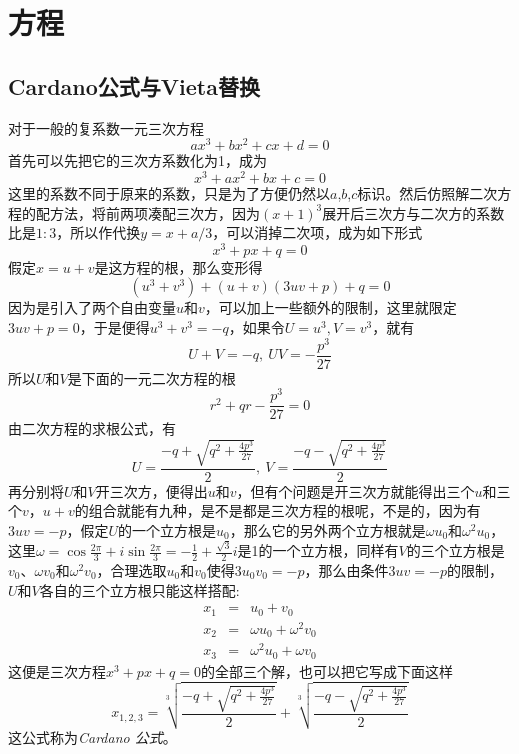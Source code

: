 
\section{方程}
\label{sec:solve-high-equation}

\subsection{Cardano公式与Vieta替换}
\label{sec:solve-equation-with-3-degree}

对于一般的复系数一元三次方程
\begin{equation*}
  ax^3+bx^2+cx+d=0
\end{equation*}
首先可以先把它的三次方系数化为1，成为
\begin{equation*}
  x^3+ax^2+bx+c=0
\end{equation*}
这里的系数不同于原来的系数，只是为了方便仍然以$a$,$b$,$c$标识。然后仿照解二次方程的配方法，将前两项凑配三次方，因为$(x+1)^3$展开后三次方与二次方的系数比是$1:3$，所以作代换$y=x+a/3$，可以消掉二次项，成为如下形式
\begin{equation*}
  x^3+px+q=0
\end{equation*}
假定$x=u+v$是这方程的根，那么变形得
\begin{equation*}
  (u^3+v^3)+(u+v)(3uv+p)+q=0
\end{equation*}
因为是引入了两个自由变量$u$和$v$，可以加上一些额外的限制，这里就限定$3uv+p=0$，于是便得$u^3+v^3=-q$，如果令$U=u^3,V=v^3$，就有
\begin{equation*}
  U+V = -q, \  UV=-\frac{p^3}{27}
\end{equation*}
所以$U$和$V$是下面的一元二次方程的根
\begin{equation*}
  r^2+qr-\frac{p^3}{27} = 0
\end{equation*}
由二次方程的求根公式，有
\begin{equation*}
  U = \frac{-q+\sqrt{q^2+\frac{4p^3}{27}}}{2}, \  V = \frac{-q-\sqrt{q^2+\frac{4p^3}{27}}}{2}
\end{equation*}
再分别将$U$和$V$开三次方，便得出$u$和$v$，但有个问题是开三次方就能得出三个$u$和三个$v$，$u+v$的组合就能有九种，是不是都是三次方程的根呢，不是的，因为有$3uv=-p$，假定$U$的一个立方根是$u_0$，那么它的另外两个立方根就是$\omega u_0$和$\omega^2 u_0$，这里$\omega=\cos{\frac{2\pi}{3}}+i\sin{\frac{2\pi}{3}}=-\frac{1}{2}+\frac{\sqrt{3}}{2}i$是1的一个立方根，同样有$V$的三个立方根是$v_0$、$\omega v_0$和$\omega^2 v_0$，合理选取$u_0$和$v_0$使得$3u_0v_0=-p$，那么由条件$3uv=-p$的限制，$U$和$V$各自的三个立方根只能这样搭配:
\begin{eqnarray*}
  x_1 & = & u_0+v_0 \\
  x_2 & = & \omega u_0 + \omega^2 v_0 \\
  x_3 & = & \omega^2 u_0 + \omega v_0
\end{eqnarray*}
这便是三次方程$x^3+px+q=0$的全部三个解，也可以把它写成下面这样
\begin{equation}
  \label{eq:cardano-formula}
  x_{1,2,3} = \sqrt[3]{\frac{-q+\sqrt{q^2+\frac{4p^3}{27}}}{2}} + \sqrt[3]{\frac{-q-\sqrt{q^2+\frac{4p^3}{27}}}{2}}
\end{equation}
这公式称为\emph{Cardano 公式}。

